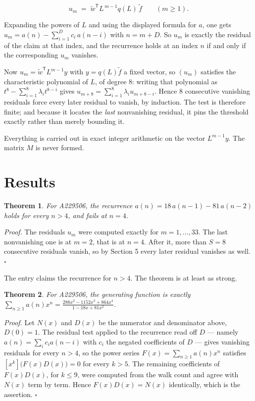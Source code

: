 \documentclass[11pt]{article}
\newtheorem{theorem}{Theorem}
\theoremstyle{definition}
\begin{document}
\[u_m \;=\; \tilde w^{\mathsf T} L^{\,m-1} q(L)\,\tilde f \qquad (m \ge 1).\]

Expanding the powers of $L$ and using the displayed formula for $a$, one gets $u_m = a(n) - \sum_{i=1}^{D} c_i\,a(n-i)$ with $n = m + D$. So $u_m$ is exactly the residual of the claim at that index, and the recurrence holds at an index $n$ if and only if the corresponding $u_m$ vanishes.

Now $u_m = \tilde w^{\mathsf T} L^{m-1} y$ with $y = q(L)\tilde f$ a fixed vector, so $(u_m)$ satisfies the characteristic polynomial of $L$, of degree $8$: writing that polynomial as $t^{8} - \sum_{i=1}^{8} \lambda_i t^{8-i}$ gives $u_{m+8} = \sum_{i=1}^{8} \lambda_i u_{m+8-i}$. Hence $8$ consecutive vanishing residuals force every later residual to vanish, by induction. The test is therefore finite; and because it locates the {\itshape last} nonvanishing residual, it pins the threshold exactly rather than merely bounding it.

Everything is carried out in exact integer arithmetic on the vector $L^{m-1}y$. The matrix $M$ is never formed.

\section{Results}

\begin{theorem} For A229506, the recurrence $a(n) = 18\,a(n-1) - 81\,a(n-2)$ holds for every $n > 4$, and fails at $n = 4$.\end{theorem}

{\itshape Proof.} The residuals $u_m$ were computed exactly for $m = 1,\dots,33$. The last nonvanishing one is at $m = 2$, that is at $n = 4$. After it, more than $S = 8$ consecutive residuals vanish, so by Section 5 every later residual vanishes as well. $\square$

The entry claims the recurrence for $n > 4$. The theorem is at least as strong.

\begin{theorem} For A229506, the generating function is exactly $\sum_{n\ge 1} a(n)x^n = \frac{288x^{2} - 1152x^{3} + 864x^{4}}{1 - 18x + 81x^{2}}$.\end{theorem}

{\itshape Proof.} Let $N(x)$ and $D(x)$ be the numerator and denominator above, $D(0)=1$. The residual test applied to the recurrence read off $D$ --- namely $a(n) = \sum_i c_i a(n-i)$ with $c_i$ the negated coefficients of $D$ --- gives vanishing residuals for every $n > 4$, so the power series $F(x)=\sum_{n\ge 1}a(n)x^n$ satisfies $[x^k]\bigl(F(x)D(x)\bigr) = 0$ for every $k > 5$. The remaining coefficients of $F(x)D(x)$, for $k \le 9$, were computed from the walk count and agree with $N(x)$ term by term. Hence $F(x)D(x) = N(x)$ identically, which is the assertion. $\square$
\end{document}
